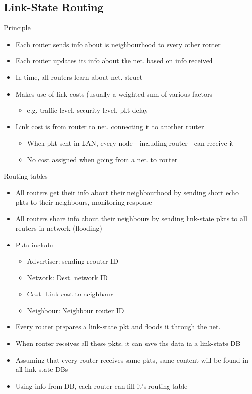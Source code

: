 \subsection{Link-State Routing}
Principle
\begin{itemize}
	\item Each router sends info about is neighbourhood to every other
		router
	\item Each router updates its info about the net. based on info received
	\item In time, all routers learn about net. struct
	\item Makes use of link costs (usually a weighted sum of various factors
	\begin{itemize}
		\item e.g. traffic level, security level, pkt delay
	\end{itemize}
	\item Link cost is from router to net. connecting it to another router
	\begin{itemize}
		\item When pkt sent in LAN, every node - including router - can
			receive it
		\item No cost assigned when going from a net. to router
	\end{itemize}
\end{itemize}
Routing tables
\begin{itemize}
	\item All routers get their info about their neighbourhood by sending
		short echo pkts to their neighbours, monitoring response
	\item All routers share info about their neighbours by sending
		link-state pkts to all routers in network (flooding)
	\item Pkts include
	\begin{itemize}
		\item Advertiser: sending reouter ID
		\item Network: Dest. network ID
		\item Cost: Link cost to neighbour
		\item Neighbour: Neighbour router ID
	\end{itemize}
	\item Every router prepares a link-state pkt and floods it through the
		net.
	\item When router receives all these pkts. it can save the data in a
		link-state DB
	\item Assuming that every router receives same pkts, same content will
		be found in all link-state DBs
	\item Using info from DB, each router can fill it's routing table
\end{itemize}
